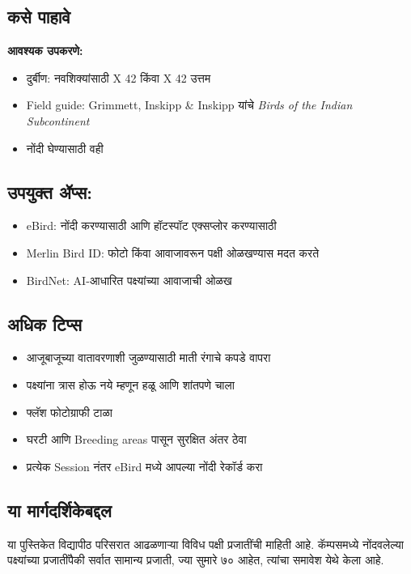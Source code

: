 \documentclass[a4paper,12pt,landscape]{memoir}
\newcommand{\introsection}[2]{%
  \begin{minipage}[t]{0.48\textwidth}
    \begin{mdframed}[
      linecolor=headingcolor,
      linewidth=1pt,
      roundcorner=5pt,
      leftmargin=0pt,
      rightmargin=0pt,
      backgroundcolor=headingcolor!5
    ]
      #1
    \end{mdframed}
  \end{minipage}\hfill
  \begin{minipage}[t]{0.48\textwidth}
    \begin{mdframed}[
      linecolor=headingcolor,
      linewidth=1pt,
      roundcorner=5pt,
      leftmargin=0pt,
      rightmargin=0pt,
      backgroundcolor=headingcolor!5
    ]
      #2
    \end{mdframed}
  \end{minipage}
  \newpage
}
\begin{document}
\introsection{%
  \section*{\textbf{कसे पाहावे}}
  \textbf{आवश्यक उपकरणे:}
  \begin{itemize}
  \item दुर्बीण: नवशिक्यांसाठी {\latintext 8 X 42} किंवा {\latintext 10 X 42} उत्तम
  \item {\latintext Field guide: Grimmett, Inskipp \& Inskipp} यांचे {\latintext \textit{Birds of the Indian Subcontinent}}
  \item नोंदी घेण्यासाठी वही
  \end{itemize}
}{%
  \section*{\textbf{उपयुक्त ॲप्स:}}
  \begin{itemize}
  \item {\latintext eBird}: नोंदी करण्यासाठी आणि हॉटस्पॉट एक्सप्लोर करण्यासाठी
  \item {\latintext Merlin Bird ID}: फोटो किंवा आवाजावरून पक्षी ओळखण्यास मदत करते
  \item {\latintext BirdNet}: {\latintext AI}-आधारित पक्ष्यांच्या आवाजाची ओळख
  \end{itemize}
}

\introsection{%
  \section*{\textbf{अधिक टिप्स}}
  \begin{itemize}
  \item आजूबाजूच्या वातावरणाशी जुळण्यासाठी माती रंगाचे कपडे वापरा
  \item पक्ष्यांना त्रास होऊ नये म्हणून हळू आणि शांतपणे चाला
  \item फ्लॅश फोटोग्राफी टाळा
  \item घरटी आणि {\latintext Breeding areas} पासून सुरक्षित अंतर ठेवा
  \item प्रत्येक {\latintext Session} नंतर {\latintext eBird} मध्ये आपल्या नोंदी रेकॉर्ड करा
  \end{itemize}
}{%
  \section*{\textbf{या मार्गदर्शिकेबद्दल}}
  या पुस्तिकेत विद्यापीठ परिसरात आढळणाऱ्या विविध पक्षी प्रजातींची माहिती आहे. कॅम्पसमध्ये नोंदवलेल्या पक्ष्यांच्या प्रजातींपैकी सर्वात सामान्य प्रजाती, ज्या सुमारे ७० आहेत, त्यांचा समावेश येथे केला आहे.
}
\end{document}

